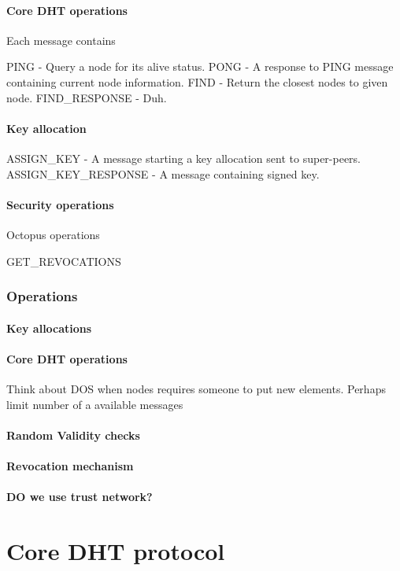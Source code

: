 \paragraph{Core DHT operations}
Each message contains

PING - Query a node for its alive status. 
PONG - A response to PING message containing current node information.
FIND - Return the closest nodes to given node.
FIND\_RESPONSE - Duh.

\paragraph{Key allocation}

ASSIGN\_KEY - A message starting a key allocation sent to super-peers.
ASSIGN\_KEY\_RESPONSE - A message containing signed key.

\paragraph{Security operations}

Octopus operations

GET\_REVOCATIONS

\subsubsection{Operations}
\paragraph{Key allocations}
\paragraph{Core DHT operations}
Think about DOS when nodes requires someone to put new elements. Perhaps limit
number of a available messages 
\paragraph{Random Validity checks}
\paragraph{Revocation mechanism}
\paragraph{DO we use trust network?}

\section{Core DHT protocol}

